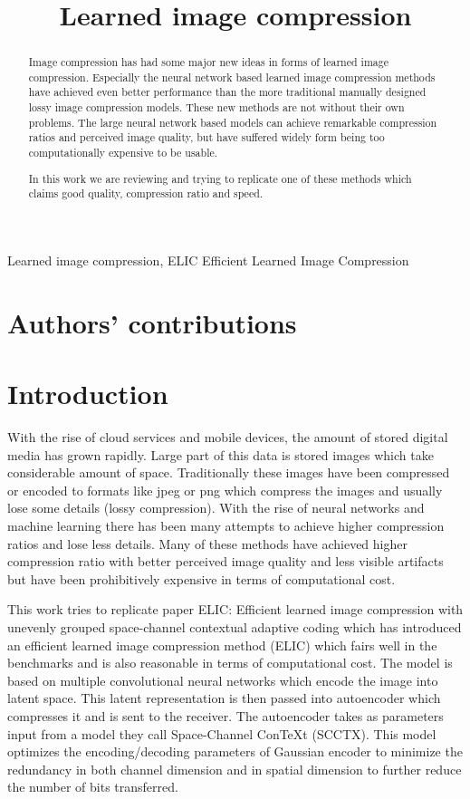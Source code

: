 \documentclass{article}
\title{Learned image compression}
\begin{document}
%
\maketitle
%
\begin{abstract}
Image compression has had some major new ideas in forms of learned image compression. 
Especially the neural network based learned image compression methods have achieved even better performance than the more traditional manually designed lossy image compression models.
These new methods are not without their own problems. The large neural network based models can achieve remarkable compression ratios and perceived image quality, but have suffered widely form being too computationally expensive to be usable.

In this work we are reviewing and trying to replicate one of these methods which claims good quality, compression ratio and speed.
\end{abstract}
%
\begin{keywords}
Learned image compression, ELIC Efficient Learned Image Compression
\end{keywords}
%

\setcounter{section}{-1}

\section{Authors' contributions}

\section{Introduction} %
\label{sec:intro}
With the rise of cloud services and mobile devices, the amount of stored digital media has grown rapidly. 
Large part of this data is stored images which take considerable amount of space.
Traditionally these images have been compressed or encoded to formats like jpeg or png which compress the images and usually lose some details (lossy compression).
With the rise of neural networks and machine learning there has been many attempts to achieve higher compression ratios and lose less details.
Many of these methods have achieved higher compression ratio with better perceived image quality and less visible artifacts but have been prohibitively expensive in terms of computational cost.

This work tries to replicate paper ELIC: Efficient learned image compression with unevenly grouped space-channel contextual adaptive coding \cite{ELIC} which has introduced an efficient learned image compression method (ELIC) which fairs well in the benchmarks and is also reasonable in terms of computational cost.
The model is based on multiple convolutional neural networks which encode the image into latent space.
This latent representation is then passed into autoencoder which compresses it and is sent to the receiver. 
The autoencoder takes as parameters input from a model they call Space-Channel ConTeXt (SCCTX).
This model optimizes the encoding/decoding parameters of Gaussian encoder to minimize the redundancy in both channel dimension and in spatial dimension to further reduce the number of bits transferred.
\end{document}
